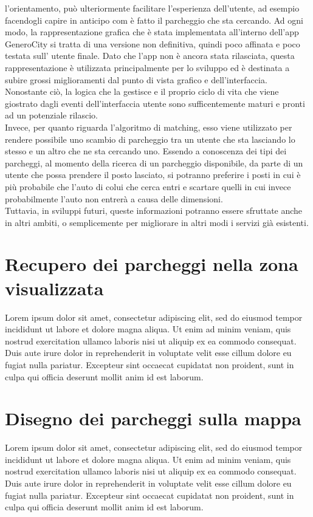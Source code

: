 l'orientamento, può ulteriormente facilitare l'esperienza dell'utente, ad esempio
facendogli capire in anticipo com è fatto il parcheggio che sta cercando.
Ad ogni modo, la rappresentazione grafica che è stata implementata all'interno
dell'app GeneroCity si tratta di una versione non definitiva, quindi poco affinata e poco
testata sull' utente finale. Dato che l'app non è ancora stata rilasciata, questa 
rappresentazione è utilizzata principalmente per lo sviluppo ed è destinata a subire
grossi miglioramenti dal punto di vista grafico e dell'interfaccia. Nonostante ciò,
la logica che la gestisce e il proprio ciclo di vita che viene giostrato dagli eventi
dell'interfaccia utente sono sufficentemente maturi e pronti ad un potenziale rilascio.\\
Invece, per quanto riguarda l'algoritmo di matching, esso viene utilizzato per 
rendere possibile uno scambio di parcheggio tra un utente che sta lasciando lo 
stesso e un altro che ne sta cercando uno. Essendo a conoscenza dei tipi dei 
parcheggi, al momento della ricerca di un parcheggio disponibile, da parte di un
utente che possa prendere il posto lasciato, si potranno preferire i posti in cui
è più probabile che l'auto di colui che cerca entri e scartare quelli in cui invece
probabilmente l'auto non entrerà a causa delle dimensioni.\\
Tuttavia, in sviluppi futuri, queste informazioni potranno essere sfruttate anche in
altri ambiti, o semplicemente per migliorare in altri modi i servizi già esistenti.


\section{Recupero dei parcheggi nella zona visualizzata} Lorem ipsum dolor sit amet, consectetur adipiscing elit, sed do eiusmod tempor incididunt ut labore et dolore magna aliqua. Ut enim ad minim veniam, quis nostrud exercitation ullamco laboris nisi ut aliquip ex ea commodo consequat. Duis aute irure dolor in reprehenderit in voluptate velit esse cillum dolore eu fugiat nulla pariatur. Excepteur sint occaecat cupidatat non proident, sunt in culpa qui officia deserunt mollit anim id est laborum.
\section{Disegno dei parcheggi sulla mappa} Lorem ipsum dolor sit amet, consectetur adipiscing elit, sed do eiusmod tempor incididunt ut labore et dolore magna aliqua. Ut enim ad minim veniam, quis nostrud exercitation ullamco laboris nisi ut aliquip ex ea commodo consequat. Duis aute irure dolor in reprehenderit in voluptate velit esse cillum dolore eu fugiat nulla pariatur. Excepteur sint occaecat cupidatat non proident, sunt in culpa qui officia deserunt mollit anim id est laborum.
